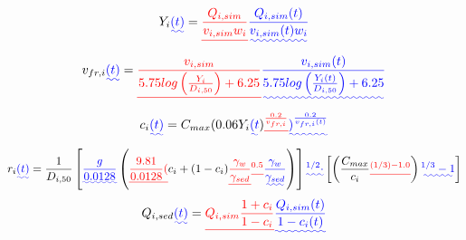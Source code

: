 \documentclass[hess, manuscript]{copernicus} %
\providecommand{\DIFadd}[1]{{\protect\color{blue}\uwave{#1}}} %
\providecommand{\DIFdel}[1]{{\protect\color{red}\sout{#1}}}                      %
\providecommand{\DIFaddbegin}{} %
\providecommand{\DIFaddend}{} %
\providecommand{\DIFdelbegin}{} %
\providecommand{\DIFdelend}{} %
\begin{document}
\begin{equation}
 Y_i\DIFaddbegin \DIFadd{(t) }\DIFaddend = \DIFdelbegin \DIFdel{\frac{Q_{i,sim}}{v_{i,sim} w_{i}}
 }\DIFdelend \DIFaddbegin \DIFadd{\frac{Q_{i,sim}(t)}{v_{i,sim}(t) w_{i}}
 }\DIFaddend \label{eq:altura}
\end{equation}
\begin{equation}
 v_{fr,i}\DIFaddbegin \DIFadd{(t) }\DIFaddend = \DIFdelbegin \DIFdel{\frac{v_{i,sim}}{5.75 log \left( \frac{Y_{i}}{D_{i,50}} \right) + 6.25}
 }\DIFdelend \DIFaddbegin \DIFadd{\frac{v_{i,sim}(t)}{5.75 log \left( \frac{Y_{i}(t)}{D_{i,50}} \right) + 6.25}
 }\DIFaddend \label{eq:velocidad}
\end{equation}
\begin{equation}
 c_{i}\DIFaddbegin \DIFadd{(t) }\DIFaddend = C_{max} (0.06 Y_{i}\DIFaddbegin \DIFadd{(t}\DIFaddend )\DIFdelbegin \DIFdel{^{\frac{0.2}{v_{fr,i}}}
 }\DIFdelend \DIFaddbegin \DIFadd{)^{\frac{0.2}{v_{fr,i}(t)}}
 }\DIFaddend \label{eq:con}
\end{equation}
\begin{equation}
r_{i}\DIFaddbegin \DIFadd{(t) }\DIFaddend = \DIFdelbegin %
\DIFdelend \frac{1}{D_{i,50}} \DIFdelbegin %
\DIFdelend \DIFaddbegin \left [ \DIFadd{\frac{g}{0.0128} }\DIFaddend \left( \DIFdelbegin \DIFdel{\frac{9.81}{0.0128} (}\DIFdelend c_i+(1-c_i) \DIFdelbegin %
\DIFdel{\frac{\gamma_w}{\gamma_{sed} }}%
\DIFdel{^{0.5} }\DIFdelend \DIFaddbegin \DIFadd{\frac{\gamma_w}{\gamma_{sed}} }\right ) \right ]\DIFadd{^{1/2} \cdot }\left[ \DIFaddend \left( \frac{C_{max}}{c_i} \DIFdelbegin %
\DIFdel{^{(1/3)-1.0}
 }\DIFdelend \DIFaddbegin \right )\DIFadd{^{1/3} -1}\right ]
 \DIFaddend \label{eq:rdf}
\end{equation}
\begin{equation}
 Q_{i,sed}\DIFaddbegin \DIFadd{(t) }\DIFaddend = \DIFdelbegin \DIFdel{Q_{i,sim} \frac{1+c_i}{1-c_i}
 }\DIFdelend \DIFaddbegin \DIFadd{\frac{Q_{i,sim}(t)}{1-c_i(t)}
 }\DIFaddend \label{eq:qescombros}
\end{equation}
\end{document}
